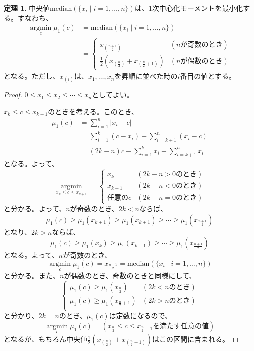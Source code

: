 \documentclass{jsarticle}
\theoremstyle{definition}
\newtheorem*{theorem}{定理}
\newcommand{\argmin}{\mathop{\mathrm{argmin}}\limits}
\begin{document}
\begin{theorem}
  中央値$\mathrm{median}(\{x_i \mid i=1,\dots,n\})$は、1次中心化モーメントを最小化する。すなわち、
  \begin{align*}
    \argmin_c\mu_1(c)&=\mathrm{median}(\{x_i \mid i=1,\dots,n\})\\
    &=
    \begin{cases}
      x_{(\frac{n+1}{2})} & (n\mbox{が奇数のとき})\\
      \frac{1}{2}(x_{(\frac{n}{2})}+x_{(\frac{n}{2}+1)}) & (n\mbox{が偶数のとき})
    \end{cases}
  \end{align*}
  となる。ただし、$x_{(i)}$は、$x_1,\dots,x_n$を昇順に並べた時の$i$番目の値とする。
\end{theorem}

\begin{proof}
  $0 \le x_1 \le x_2 \le \cdots \le x_n$としてよい。

  $x_k \le c \le x_{k+1}$のときを考える。このとき、
  \begin{align*}
    \mu_1(c)&=\sum_{i=1}^n|x_i-c|\\
    &=\sum_{i=1}^k(c-x_i)+\sum_{i=k+1}^n(x_i-c)\\
    &=(2k-n)c-\sum_{i=1}^kx_i+\sum_{i=k+1}^nx_i
  \end{align*}
  となる。よって、
  \[
    \argmin_{x_k \le c \le x_{k+1}}=
    \begin{cases}
      x_k & (2k-n>0\mbox{のとき})\\
      x_{k+1} & (2k-n<0\mbox{のとき})\\
      \mbox{任意の}c & (2k-n=0\mbox{のとき})
    \end{cases}
  \]
  と分かる。よって、$n$が奇数のとき、$2k<n$ならば、
  \[
    \mu_1(c) \ge \mu_1(x_{k+1}) \ge \mu_1(x_{k+1}) \ge \cdots \ge \mu_1 (x_{\frac{n+1}{2}})
  \]
  となり、$2k>n$ならば、
  \[
    \mu_1(c) \ge \mu_1(x_{k}) \ge \mu_1(x_{k-1}) \ge \cdots \ge \mu_1 (x_{\frac{n+1}{2}})
  \]
  となる。よって、$n$が奇数のとき、
  \[
    \argmin_c\mu_1(c)=x_{\frac{n+1}{2}}=\mathrm{median}(\{x_i \mid i=1,\dots,n\})
  \]
  と分かる。また、$n$が偶数のとき、奇数のときと同様にして、
  \[
    \begin{cases}
      \mu_1(c) \ge \mu_1(x_{\frac{n}{2}}) & (2k<n\mbox{のとき})\\
      \mu_1(c) \ge \mu_1(x_{\frac{n}{2}+1}) & (2k>n\mbox{のとき})\\
    \end{cases}
  \]
  と分かり、$2k=n$のとき、$\mu_1(c)$は定数になるので、
  \[
    \argmin_c\mu_1(c)=(x_{\frac{n}{2}} \le c \le x_{\frac{n}{2}+1}\mbox{を満たす任意の値})
  \]
  となるが、もちろん中央値$\frac{1}{2}(x_{(\frac{n}{2})}+x_{(\frac{n}{2}+1)})$はこの区間に含まれる。

\end{proof}
\end{document}
